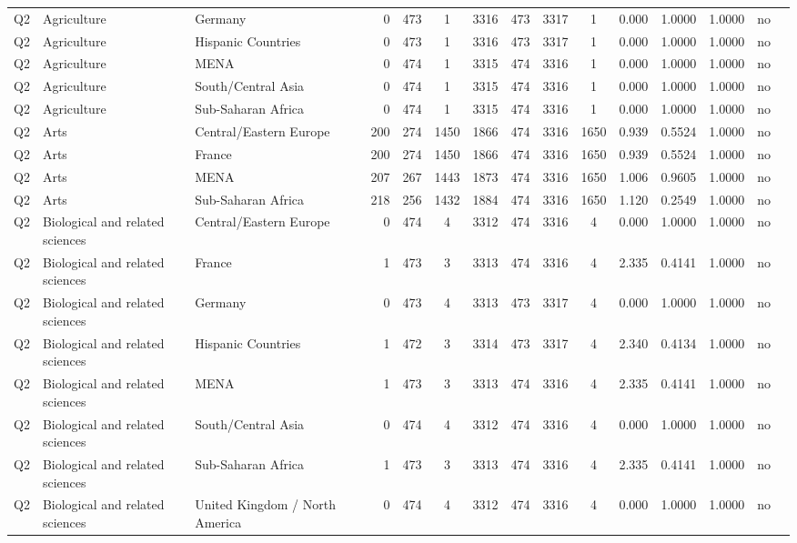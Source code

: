 \begin{longtable}{lllrcccccccccll}
Q2 & Agriculture & Germany & 0 & 473 & 1 & 3316 & 473 & 3317 & 1 & 0.000 & 1.0000 & 1.0000 & no \\
Q2 & Agriculture & Hispanic Countries & 0 & 473 & 1 & 3316 & 473 & 3317 & 1 & 0.000 & 1.0000 & 1.0000 & no \\
Q2 & Agriculture & MENA & 0 & 474 & 1 & 3315 & 474 & 3316 & 1 & 0.000 & 1.0000 & 1.0000 & no \\
Q2 & Agriculture & South/Central Asia & 0 & 474 & 1 & 3315 & 474 & 3316 & 1 & 0.000 & 1.0000 & 1.0000 & no \\
Q2 & Agriculture & Sub-Saharan Africa & 0 & 474 & 1 & 3315 & 474 & 3316 & 1 & 0.000 & 1.0000 & 1.0000 & no \\
Q2 & Arts & Central/Eastern Europe & 200 & 274 & 1450 & 1866 & 474 & 3316 & 1650 & 0.939 & 0.5524 & 1.0000 & no \\
Q2 & Arts & France & 200 & 274 & 1450 & 1866 & 474 & 3316 & 1650 & 0.939 & 0.5524 & 1.0000 & no \\
Q2 & Arts & MENA & 207 & 267 & 1443 & 1873 & 474 & 3316 & 1650 & 1.006 & 0.9605 & 1.0000 & no \\
Q2 & Arts & Sub-Saharan Africa & 218 & 256 & 1432 & 1884 & 474 & 3316 & 1650 & 1.120 & 0.2549 & 1.0000 & no \\
Q2 & Biological and related sciences & Central/Eastern Europe & 0 & 474 & 4 & 3312 & 474 & 3316 & 4 & 0.000 & 1.0000 & 1.0000 & no \\
Q2 & Biological and related sciences & France & 1 & 473 & 3 & 3313 & 474 & 3316 & 4 & 2.335 & 0.4141 & 1.0000 & no \\
Q2 & Biological and related sciences & Germany & 0 & 473 & 4 & 3313 & 473 & 3317 & 4 & 0.000 & 1.0000 & 1.0000 & no \\
Q2 & Biological and related sciences & Hispanic Countries & 1 & 472 & 3 & 3314 & 473 & 3317 & 4 & 2.340 & 0.4134 & 1.0000 & no \\
Q2 & Biological and related sciences & MENA & 1 & 473 & 3 & 3313 & 474 & 3316 & 4 & 2.335 & 0.4141 & 1.0000 & no \\
Q2 & Biological and related sciences & South/Central Asia & 0 & 474 & 4 & 3312 & 474 & 3316 & 4 & 0.000 & 1.0000 & 1.0000 & no \\
Q2 & Biological and related sciences & Sub-Saharan Africa & 1 & 473 & 3 & 3313 & 474 & 3316 & 4 & 2.335 & 0.4141 & 1.0000 & no \\
Q2 & Biological and related sciences & United Kingdom / North America & 0 & 474 & 4 & 3312 & 474 & 3316 & 4 & 0.000 & 1.0000 & 1.0000 & no \\

\end{longtable}
